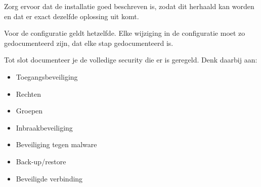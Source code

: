 Zorg ervoor dat de installatie goed beschreven is, zodat dit herhaald kan worden en dat er exact dezelfde oplossing uit komt.

Voor de configuratie geldt hetzelfde. Elke wijziging in de configuratie moet zo gedocumenteerd zijn, dat elke stap gedocumenteerd is.

Tot slot documenteer je de volledige security die er is geregeld. Denk daarbij aan:
\begin{itemize}
\item Toegangsbeveiliging
\item Rechten
\item Groepen
\item Inbraakbeveiliging
\item Beveiliging tegen malware
\item Back-up/restore
\item Beveiligde verbinding
\end{itemize}
